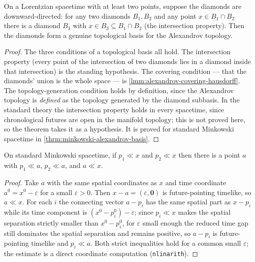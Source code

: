 \begin{theorem}
    \label{thrm:alexandrov-topological-basis}
    \leanok
    On a Lorentzian spacetime with at least two points, suppose the diamonds are downward-directed: for any two diamonds $B_1, B_2$ and any point $x \in B_1 \cap B_2$ there is a diamond $B_3$ with $x \in B_3 \subseteq B_1 \cap B_2$ (the intersection property). Then the diamonds form a genuine topological basis for the Alexandrov topology.
\end{theorem}
\begin{proof}
    \leanok
    The three conditions of a topological basis all hold. The intersection property (every point of the intersection of two diamonds lies in a diamond inside that intersection) is the standing hypothesis. The covering condition --- that the diamonds' union is the whole space --- is \ref{lmm:alexandrov-covering-hausdorff}. The topology-generation condition holds by definition, since the Alexandrov topology is \emph{defined} as the topology generated by the diamond subbasis. In the standard theory the intersection property holds in every spacetime, since chronological futures are open in the manifold topology; this is not proved here, so the theorem takes it as a hypothesis. It is proved for standard Minkowski spacetime in \ref{thrm:minkowski-alexandrov-basis}.
\end{proof}

\medskip

\begin{lemma}
    \label{lmm:minkowski-past-between}
    \leanok
    On standard Minkowski spacetime, if $p_1 \ll x$ and $p_2 \ll x$ then there is a point $a$ with $p_1 \ll a$, $p_2 \ll a$, and $a \ll x$.
\end{lemma}
\begin{proof}
    \leanok
    Take $a$ with the same spatial coordinates as $x$ and time coordinate $a^0 = x^0 - \varepsilon$ for a small $\varepsilon > 0$. Then $x - a = (\varepsilon, \mathbf{0})$ is future-pointing timelike, so $a \ll x$. For each $i$ the connecting vector $a - p_i$ has the same spatial part as $x - p_i$ while its time component is $(x^0 - p_i^0) - \varepsilon$; since $p_i \ll x$ makes the spatial separation strictly smaller than $x^0 - p_i^0$, for $\varepsilon$ small enough the reduced time gap still dominates the spatial separation and remains positive, so $a - p_i$ is future-pointing timelike and $p_i \ll a$. Both strict inequalities hold for a common small $\varepsilon$; the estimate is a direct coordinate computation (\texttt{nlinarith}).
\end{proof}

